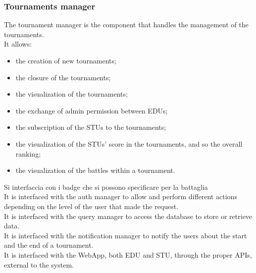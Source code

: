 \subsubsection*{Tournaments manager}
The tournament manager is the component that handles the management of the tournaments.\\
It allows:
\begin{itemize}
    \item the creation of new tournaments;
    \item the closure of the tournaments;
    \item the visualization of the tournaments;
    \item the exchange of admin permission between EDUs;
    \item the subscription of the STUs to the tournaments;
    \item the visualization of the STUs' score in the tournaments, and so the overall ranking;
    \item the visualization of the battles within a tournament.
\end{itemize}
{\color{red} Si interfaccia con i badge che si possono specificare per la battaglia\\}
It is interfaced with the auth manager to allow and perform different actions depending on the level of the user that made the request. \\
It is interfaced with the query manager to access the database to store or retrieve data. \\
It is interfaced with the notification manager to notify the users about the start and the end of a tournament.\\
It is interfaced with the WebApp, both EDU and STU, through the proper APIs, external to the system.

